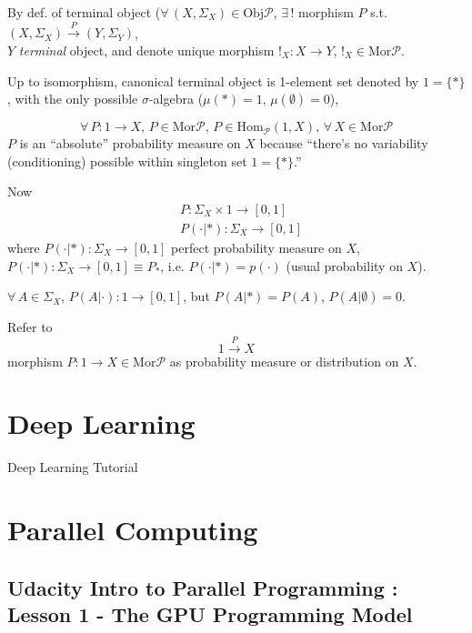 \documentclass[10pt]{amsart}
\begin{document}
\begin{multicols*}{2}
By def. of terminal object ($\forall \, (X,\Sigma_X) \in \text{Obj}\mathcal{P}$, $\exists \, !$ morphism $P$ s.t. $(X,\Sigma_X) \xrightarrow{P} (Y,\Sigma_Y)$, \\
$Y$ \emph{terminal} object, and denote unique morphism $!_X : X\to Y$, $!_X \in \text{Mor}\mathcal{P}$.  

Up to isomorphism, canonical terminal object is 1-element set denoted by $1 = \lbrace * \rbrace$, with the only possible $\sigma$-algebra ($\mu(*)=1, \, \mu(\emptyset) = 0$),

\[
\forall \, P:1 \to X, \, P\in \text{Mor}\mathcal{P}, \, P \in \text{Hom}_{\mathcal{P}}(1,X) , \, \forall \, X \in \text{Mor}\mathcal{P}
\]
$P$ is an ``absolute'' probability measure on $X$ because ``there's no variability (conditioning) possible within singleton set $1 = \lbrace * \rbrace$.''  \cite{CS2013}

Now
\[
\begin{aligned}
  & P:\Sigma_X \times 1 \to [0,1] \\ 
  & P(\cdot | *) : \Sigma_X \to [0,1]
\end{aligned}
\]
where $P(\cdot | *) : \Sigma_X \to [0,1]$ perfect probability measure on $X$, $P(\cdot | *) : \Sigma_X \to [0,1] \equiv P_*$, i.e. $P(\cdot | *) = p(\cdot )$ (usual probability on $X$).  

$\forall \, A \in \Sigma_X$, $P(A|\cdot ) : 1 \to [ 0,1]$, but $P(A|*) = P(A)$, $P(A|\emptyset ) = 0$.  

Refer to 
\[
1\xrightarrow{P} X
\]
morphism $P:1\to X \in \text{Mor}\mathcal{P}$ as probability measure or distribution on $X$.  



\section{Deep Learning}

Deep Learning Tutorial \cite{LISA2015}




\section{Parallel Computing}

\subsection{Udacity Intro to Parallel Programming : Lesson 1 - The GPU Programming Model}


\end{multicols*}
\end{document}
